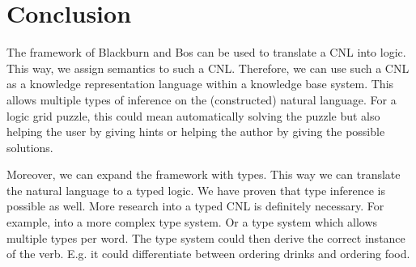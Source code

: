 \section{Conclusion}
The framework of Blackburn and Bos can be used to translate a CNL into logic. This way, we assign semantics to such a CNL. Therefore, we can use such a CNL as a knowledge representation language within a knowledge base system. This allows multiple types of inference on the (constructed) natural language. For a logic grid puzzle, this could mean automatically solving the puzzle but also helping the user by giving hints or helping the author by giving the possible solutions.

Moreover, we can expand the framework with types. This way we can translate the natural language to a typed logic. We have proven that type inference is possible as well. More research into a typed CNL is definitely necessary. For example, into a more complex type system. Or a type system which allows multiple types per word. The type system could then derive the correct instance of the verb. E.g. it could differentiate between ordering drinks and ordering food.
